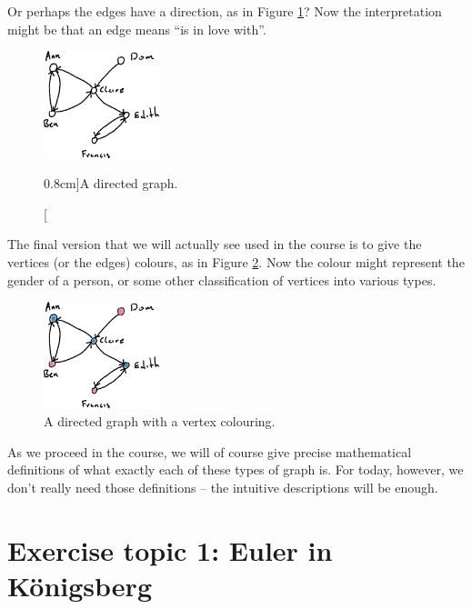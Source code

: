 \documentclass[nobib]{tufte-handout}
\begin{document}
Or perhaps the edges have a direction, as in Figure \ref{fig:labelled_digraph}? Now the interpretation might be that an edge means ``is in love with''.

\begin{figure}
  \centering
  \includegraphics[width=0.3\textwidth]{graphics/L1_exc/digraph.png}
  \caption[][0.8cm]{A directed graph.}
  \label{fig:labelled_digraph}
\end{figure}

The final version that we will actually see used in the course is to give the vertices (or the edges) colours, as in Figure \ref{fig:vertex_coloured_graph}. Now the colour might represent the gender of a person, or some other classification of vertices into various types.

\begin{figure}
  \centering
  \includegraphics[width=0.3\textwidth]{graphics/L1_exc/vertex_coloured_digraph.png}
  \caption{A directed graph with a vertex colouring.}
  \label{fig:vertex_coloured_graph}
\end{figure}

As we proceed in the course, we will of course give precise mathematical definitions of what exactly each of these types of graph is. For today, however, we don't really need those definitions -- the intuitive descriptions will be enough.

\section{Exercise topic 1: Euler in Königsberg}
\end{document}
